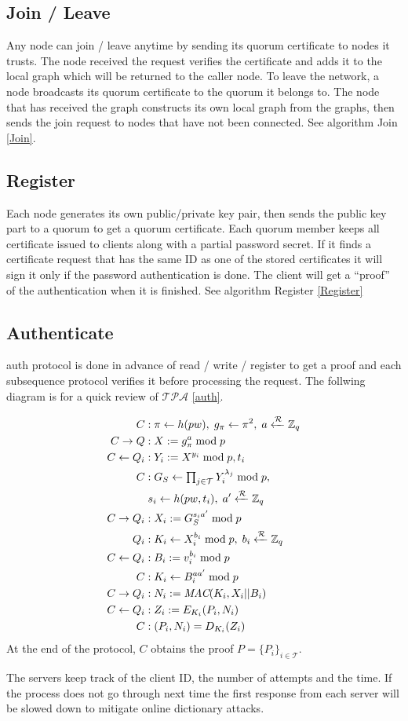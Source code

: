 \subsection{Join / Leave}
Any node can join / leave anytime by sending its quorum certificate to
nodes it trusts. The node received the request verifies the
certificate and adds it to the local graph which will be returned to
the caller node. To leave the network, a node broadcasts its quorum
certificate to the quorum it belongs to.
The node that has received the graph constructs its own local graph
from the graphs, then sends the join request to nodes that have not
been connected.
See algorithm {\sf Join} \ref{Join}.

\subsection{Register}
\label{register}
Each node generates its own public/private key pair, then sends the
public key part to a quorum to get a quorum certificate. Each quorum
member keeps all certificate issued to clients along with a partial
password secret. If it finds a certificate request that has the same
ID as one of the stored certificates it will sign it only if the
password authentication is done. The client will get a ``proof'' of
the authentication when it is finished.
See algorithm {\sf Register} \ref{Register}

\subsection{Authenticate}
\label{authenticate}
{\sf auth} protocol is done in advance of {\sf read / write /
  register} to get a proof and each subsequence protocol verifies it
before processing the request. The follwing diagram is for a quick
review of $\mathcal{TPA}$ \ref{auth}.

\begin{align*}
  C &: \pi \leftarrow h(pw), \;
      g_{\pi} \leftarrow \pi^2, \;
      a \xleftarrow{\mathcal{R}} \mathbb{Z}_q \\
  C \rightarrow Q &: X := g_{\pi}^a \bmod p \\
  C \leftarrow Q_i &: Y_i := X^{y_i} \bmod p, t_i \\
  C &: G_S \leftarrow \textstyle \prod_{j \in \mathcal{T}}Y_i^{\lambda_j} \bmod p, \\
    & \; s_i \leftarrow h(pw, t_i), \;
      a' \xleftarrow{\mathcal{R}} \mathbb{Z}_q \\
  C \rightarrow Q_i &: X_i := G_S^{s_ia'} \bmod p \\
  Q_i &: K_i \leftarrow X_i^{b_i} \bmod p, \;
        b_i \xleftarrow{\mathcal{R}} \mathbb{Z}_q \\
  C \leftarrow Q_i &: B_i := v_i^{b_i} \bmod p \\
  C &: K_i \leftarrow B_i^{aa'} \bmod p \\
  C \rightarrow Q_i &: N_i := \text{\em MAC}(K_i, X_i || B_i) \\
  C \leftarrow Q_i &: Z_i := E_{K_i}(P_i, N_i) \\
  C &: (P_i, N_i) = D_{K_i}(Z_i)
\end{align*}
At the end of the protocol, $C$ obtains the proof $P = \{P_i\}_{i \in
  \mathcal{T}}$.

The servers keep track of the client ID, the number of attempts and
the time. If the process does not go through next time the first
response from each server will be slowed down to mitigate online
dictionary attacks.
